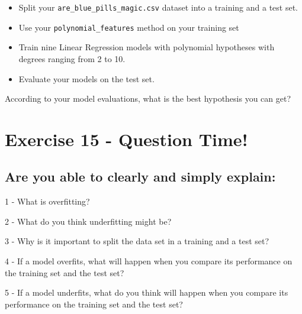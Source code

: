 \documentclass[]{article}
\begin{document}
\begin{itemize}
\item
  Split your \texttt{are\_blue\_pills\_magic.csv} dataset into a
  training and a test set.
\item
  Use your \texttt{polynomial\_features} method on your training set
\item
  Train nine Linear Regression models with polynomial hypotheses with
  degrees ranging from 2 to 10.
\item
  Evaluate your models on the test set.
\end{itemize}

According to your model evaluations, what is the best hypothesis you can
get? \clearpage

\hypertarget{exercise-15---question-time-1}{%
\section{Exercise 15 - Question
Time!}\label{exercise-15---question-time-1}}

\hypertarget{are-you-able-to-clearly-and-simply-explain-2}{%
\subsection{Are you able to clearly and simply
explain:}\label{are-you-able-to-clearly-and-simply-explain-2}}

1 - What is overfitting?

2 - What do you think underfitting might be?

3 - Why is it important to split the data set in a training and a test
set?

4 - If a model overfits, what will happen when you compare its
performance on the training set and the test set?

5 - If a model underfits, what do you think will happen when you compare
its performance on the training set and the test set? \clearpage
\end{document}
